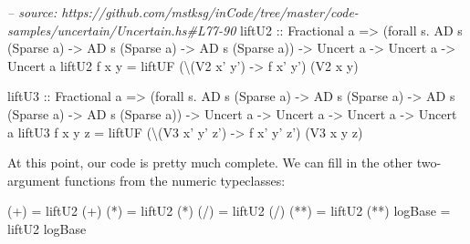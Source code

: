 \documentclass[]{article}
\newenvironment{Shaded}{}{}
\newcommand{\DataTypeTok}[1]{\textcolor[rgb]{0.56,0.13,0.00}{{#1}}}
\newcommand{\CommentTok}[1]{\textcolor[rgb]{0.38,0.63,0.69}{\textit{{#1}}}}
\newcommand{\OtherTok}[1]{\textcolor[rgb]{0.00,0.44,0.13}{{#1}}}
\newcommand{\FunctionTok}[1]{\textcolor[rgb]{0.02,0.16,0.49}{{#1}}}
\newcommand{\NormalTok}[1]{{#1}}
\begin{document}
\begin{Shaded}
\begin{Highlighting}[]
\CommentTok{-- source: https://github.com/mstksg/inCode/tree/master/code-samples/uncertain/Uncertain.hs#L77-90}
\OtherTok{liftU2 ::} \DataTypeTok{Fractional} \NormalTok{a}
       \OtherTok{=>} \NormalTok{(forall s}\FunctionTok{.} \DataTypeTok{AD} \NormalTok{s (}\DataTypeTok{Sparse} \NormalTok{a) }\OtherTok{->} \DataTypeTok{AD} \NormalTok{s (}\DataTypeTok{Sparse} \NormalTok{a) }\OtherTok{->} \DataTypeTok{AD} \NormalTok{s (}\DataTypeTok{Sparse} \NormalTok{a))}
       \OtherTok{->} \DataTypeTok{Uncert} \NormalTok{a}
       \OtherTok{->} \DataTypeTok{Uncert} \NormalTok{a}
       \OtherTok{->} \DataTypeTok{Uncert} \NormalTok{a}
\NormalTok{liftU2 f x y }\FunctionTok{=} \NormalTok{liftUF (\textbackslash{}(}\DataTypeTok{V2} \NormalTok{x' y') }\OtherTok{->} \NormalTok{f x' y') (}\DataTypeTok{V2} \NormalTok{x y)}

\OtherTok{liftU3 ::} \DataTypeTok{Fractional} \NormalTok{a}
       \OtherTok{=>} \NormalTok{(forall s}\FunctionTok{.} \DataTypeTok{AD} \NormalTok{s (}\DataTypeTok{Sparse} \NormalTok{a) }\OtherTok{->} \DataTypeTok{AD} \NormalTok{s (}\DataTypeTok{Sparse} \NormalTok{a) }\OtherTok{->} \DataTypeTok{AD} \NormalTok{s (}\DataTypeTok{Sparse} \NormalTok{a) }\OtherTok{->} \DataTypeTok{AD} \NormalTok{s (}\DataTypeTok{Sparse} \NormalTok{a))}
       \OtherTok{->} \DataTypeTok{Uncert} \NormalTok{a}
       \OtherTok{->} \DataTypeTok{Uncert} \NormalTok{a}
       \OtherTok{->} \DataTypeTok{Uncert} \NormalTok{a}
       \OtherTok{->} \DataTypeTok{Uncert} \NormalTok{a}
\NormalTok{liftU3 f x y z }\FunctionTok{=} \NormalTok{liftUF (\textbackslash{}(}\DataTypeTok{V3} \NormalTok{x' y' z') }\OtherTok{->} \NormalTok{f x' y' z') (}\DataTypeTok{V3} \NormalTok{x y z)}
\end{Highlighting}
\end{Shaded}

At this point, our code is pretty much complete. We can fill in the other
two-argument functions from the numeric typeclasses:

\begin{Shaded}
\begin{Highlighting}[]
\NormalTok{(}\FunctionTok{+}\NormalTok{)     }\FunctionTok{=} \NormalTok{liftU2 (}\FunctionTok{+}\NormalTok{)}
\NormalTok{(}\FunctionTok{*}\NormalTok{)     }\FunctionTok{=} \NormalTok{liftU2 (}\FunctionTok{*}\NormalTok{)}
\NormalTok{(}\FunctionTok{/}\NormalTok{)     }\FunctionTok{=} \NormalTok{liftU2 (}\FunctionTok{/}\NormalTok{)}
\NormalTok{(}\FunctionTok{**}\NormalTok{)    }\FunctionTok{=} \NormalTok{liftU2 (}\FunctionTok{**}\NormalTok{)}
\NormalTok{logBase }\FunctionTok{=} \NormalTok{liftU2 logBase}
\end{Highlighting}
\end{Shaded}
\end{document}
